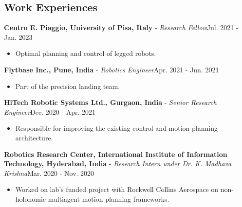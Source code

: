 \documentclass[letter]{res}
\begin{document}
\begin{resume}
\section{\textcolor{Bittersweet}{Work Experiences}}
      
\textbf{Centro E. Piaggio, University of Pisa, Italy} \newline - {\sl Research Fellow}\hfill Jul. 2021 - Jan. 2023 \\
 \vspace{-2mm}
\begin{itemize}\item Optimal planning and control of legged robots. 
\end{itemize}
  \vspace{-2mm}
  

  
  \textbf{Flytbase Inc., Pune, India} \newline - {\sl Robotics Engineer}\hfill Apr. 2021 - Jun. 2021 \\
 \vspace{-2mm}
\begin{itemize}\item Part of the precision landing team.
\end{itemize}
  \vspace{-2mm}
    
  
  
  \textbf{HiTech Robotic Systems Ltd., Gurgaon, India} \newline - {\sl Senior Research Engineer}\hfill Dec. 2020 - Apr. 2021 \\
 \vspace{-2mm}
\begin{itemize}\item Responsible for improving the existing control and motion planning architecture.
\end{itemize}
  \vspace{-2mm}
  

  
   \textbf{Robotics Research Center, International Institute of Information Technology, Hyderabad, India} \newline - {\sl Research Intern under Dr. K. Madhava Krishna}\hfill Mar. 2020 - Nov. 2020 \\
 \vspace{-3mm}
 \begin{itemize}
  \item {  Worked on lab's funded project with Rockwell Collins Aerospace on non-holonomic multiagent motion planning frameworks.
  }
    

\end{itemize}
\end{resume}
\end{document}
